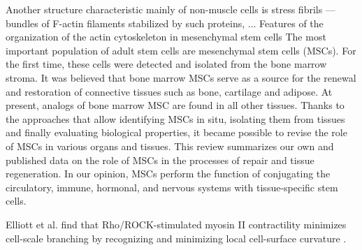 \documentclass[a4paper,12pt]{article}
\begin{document}
Another structure characteristic mainly of non-muscle cells is stress fibrils — bundles of F-actin filaments stabilized by such proteins, ...
Features of the organization of the actin cytoskeleton in mesenchymal stem cells
The most important population of adult stem cells are mesenchymal stem cells (MSCs). For the first time, these cells were detected and isolated from the bone marrow stroma. It was believed that bone marrow MSCs serve as a source for the renewal and restoration of connective tissues such as bone, cartilage and adipose. At present, analogs of bone marrow MSC are found in all other tissues. Thanks to the approaches that allow identifying MSCs in situ, isolating them from tissues and finally evaluating biological properties, it became possible to revise the role of MSCs in various organs and tissues. This review summarizes our own and published data on the role of MSCs in the processes of repair and tissue regeneration. In our opinion, MSCs perform the function of conjugating the circulatory, immune, hormonal, and nervous systems with tissue-specific stem cells.


Elliott et al. find that Rho/ROCK-stimulated myosin II contractility minimizes cell-scale branching by recognizing and minimizing local cell-surface curvature \cite{elliott2015myosin}.
\end{document}

